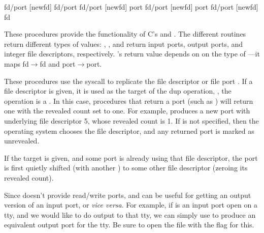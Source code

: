             {fd/port [newfd]} {fd/port}
    {fd/port [newfd]} {port}
   {fd/port [newfd]} {port}
      {fd/port [newfd]} {fd}
\begin{desc}
These procedures provide the functionality of C's  and .
The different routines return different types of values:
, , and  return
input ports, output ports, and integer file descriptors, respectively.
's return value depends on on the type of 
---it maps fd$\rightarrow$fd and port$\rightarrow$port.

These procedures use the {\Unix}  syscall to replicate
the file descriptor or file port .
If a  file descriptor is given, it is used as the target of
the dup operation, \ie, the operation is a .
In this case, procedures that return a port (such as )
will return one with the revealed count set to one.
For example,  produces
a new port with underlying file descriptor 5, whose revealed count is 1.
If  is not specified, 
then the operating system chooses the file descriptor, 
and any returned port is marked as unrevealed.

If the  target is given, 
and some port is already using that file descriptor,
the port is first quietly shifted (with another ) 
to some other file descriptor (zeroing its revealed count).

Since {\Scheme} doesn't provide read/write ports,  and
 can be useful for getting an output version of an
input port, or \emph{vice versa}.  For example, if  is an input
port open on a tty, and we would like to do output to that tty, we can
simply use  to produce an equivalent output port
for the tty. Be sure to open the file with the 
flag for this.
\end{desc}

